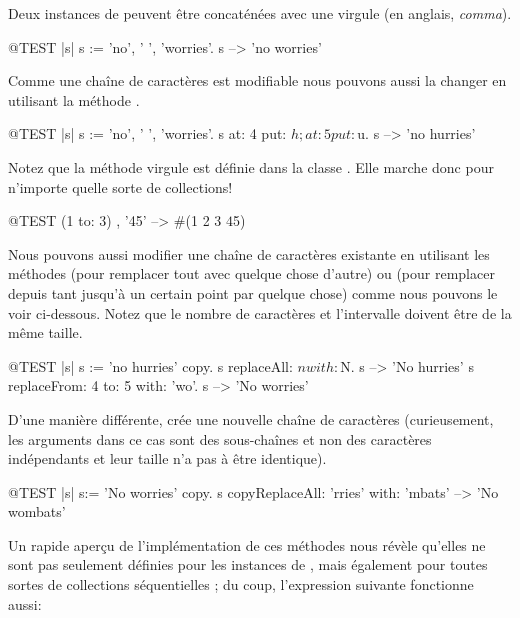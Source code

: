 \documentclass[a4paper,10pt,twoside]{book}
\begin{document}
Deux instances de  peuvent être concaténées avec une virgule (en anglais, \emph{comma}).
\begin{code}{@TEST |s|}
s := 'no', ' ', 'worries'.
s -->  'no worries'
\end{code}

Comme une chaîne de caractères est modifiable nous pouvons aussi la
changer en utilisant la méthode .

\begin{code}{@TEST |s| s := 'no', ' ', 'worries'.}
s at: 4 put: $h; at: 5 put: $u.
s --> 'no hurries'
\end{code}

Notez que la méthode virgule est définie dans la classe .
Elle marche donc pour n'importe quelle sorte de collections!
\begin{code}{@TEST}
(1 to: 3) , '45' --> #(1 2 3 $4 $5)
\end{code}

Nous pouvons aussi modifier une chaîne de caractères existante
en utilisant les méthodes  
(pour remplacer tout avec quelque chose d'autre)
ou 
(pour remplacer depuis tant jusqu'à un certain point par quelque chose)
comme nous pouvons le voir ci-dessous. Notez que le nombre de caractères
et l'intervalle doivent être de la même taille.

\begin{code}{@TEST |s| s := 'no hurries' copy.}
s replaceAll: $n with: $N.
s --> 'No hurries'
s replaceFrom: 4 to: 5 with: 'wo'.
s --> 'No worries'
\end{code}

D'une manière différente,  crée 
une nouvelle chaîne de caractères (curieusement, les arguments dans ce cas sont des sous-chaînes et non des caractères indépendants et leur taille n'a pas à être identique).

\begin{code}{@TEST |s| s:= 'No worries' copy.}
s copyReplaceAll: 'rries' with: 'mbats' --> 'No wombats'
\end{code}

Un rapide aperçu de l'implémentation de ces méthodes nous révèle
qu'elles ne sont pas seulement définies pour les instances de
, mais également pour toutes sortes de collections 
séquentielles ; du coup, l'expression suivante
fonctionne aussi:
\end{document}
